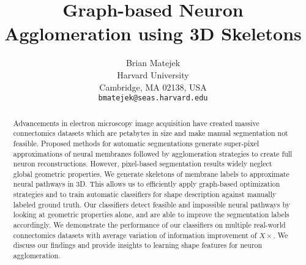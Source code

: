 \documentclass[10pt,twocolumn,letterpaper]{article}
\begin{document}
\title{Graph-based Neuron Agglomeration using 3D Skeletons}


\author{Brian Matejek\\
Harvard University\\
Cambridge, MA 02138, USA\\
{\tt\small bmatejek@seas.harvard.edu}
}

\maketitle

\begin{abstract}
Advancements in electron microscopy image acquisition have created massive connectomics datasets which are petabytes in size and make manual segmentation not feasible. 
Proposed methods for automatic segmentations generate super-pixel approximations of neural membranes followed by agglomeration strategies to create full neuron reconstructions. 
However, pixel-based segmentation results widely neglect global geometric properties.
We generate skeletons of membrane labels to approximate neural pathways in 3D. This allows us to efficiently apply graph-based optimization strategies and to train automatic classifiers for shape description against manually labeled ground truth. Our classifiers detect feasible and impossible neural pathways by looking at geometric properties alone, and are able to improve the segmentation labels accordingly. We demonstrate the performance of our classifiers on multiple real-world connectomics datasets with average variation of information improvement of $X\times$. We discuss our findings and provide insights to learning shape features for neuron agglomeration.
\end{abstract}














{\small

}
\end{document}

